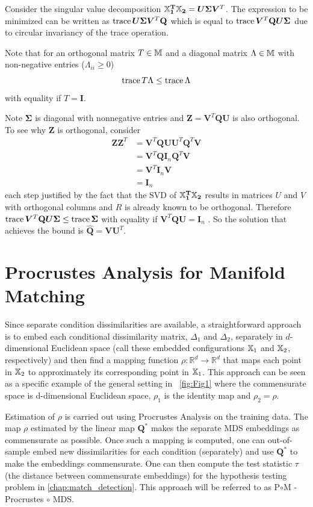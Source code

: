 \documentclass[12pt,oneside,final]{thesis}
\begin{document}
 Consider the singular value decomposition $\mathbf{{\mathbb{X}}_1^T {\mathbb{X}}_2}=\bm{U} \bm{\Sigma} \bm{V}^T$. The expression to be minimized can be written as $\operatorname{trace} {\bm{U} \bm{\Sigma} \bm{V}^T \mathbf{Q}}$ which is equal to  $\operatorname{trace} { \bm{V}^T \mathbf{Q} \bm{U} \bm{\Sigma}} $ due to circular invariancy of the trace operation.
 
 Note that for an orthogonal matrix $T\in \mathbb{M}$ and a diagonal matrix $\Lambda \in \mathbb{M}$ with non-negative entries ($\Lambda_{ii}\geq 0$)
 \[
 \operatorname{trace}{ T \Lambda } \leq \operatorname{trace}{ \Lambda} \] with equality if $T=\bm{I}$.
 
 Note $\bm{\Sigma}$ is diagonal with nonnegative entries  and $\bm{Z}=\bm{V}^T \mathbf{Q} \bm{U}$ is also orthogonal. To see why $\bm{Z}$ is orthogonal, consider 
 \begin{align*}
 \bm{Z}\bm{Z}^T &= \bm{V}^T \mathbf{Q} \bm{U} \bm{U}^T \mathbf{Q}^T  \bm{V} \\
 &= \bm{V}^T \mathbf{Q} \bm{I}_n \mathbf{Q}^T  \bm{V}\\
 &= \bm{V}^T \bm{I}_n  \bm{V} \\
 &= \bm{I}_n
 \end{align*} 
 each step justified by the fact that the SVD of $\mathbf{{\mathbb{X}}_1^T {\mathbb{X}}_2}$ results in matrices  $U$ and $V$ with orthogonal columns and $R$ is already known to be orthogonal.
 Therefore  $\operatorname{trace} { \bm{V}^T \mathbf{Q} \bm{U} \bm{\Sigma}}  \leq \operatorname{trace} \bm{\Sigma}$ 
with equality if  $\bm{V}^T \mathbf{Q} \bm{U} = \bm{I}_n$ . So the solution  that achieves the bound is $\hat{\mathbf{Q}}= \bm{V}  \bm{U}^T$.

\section{Procrustes Analysis for Manifold Matching}

Since separate  condition dissimilarities are available, a straightforward approach is to embed each conditional dissimilarity matrix, $\Delta_1$ and $\Delta_2$, separately  in  $d$-dimensional Euclidean space (call these embedded configurations ${\mathbb{X}}_1$ and ${\mathbb{X}}_2$, respectively) and then find a mapping function $\rho :\mathbb{R}^{d}\rightarrow\mathbb{R}^{d}$ that maps each point in ${\mathbb{X}}_2$ to approximately its corresponding point in ${\mathbb{X}}_1$. This approach can be seen as a specific example of the general setting in  ~\autoref{fig:Fig1} where the commensurate space is d-dimensional  Euclidean space, $\rho_1$  is the identity map and $\rho_2=\rho$. 

Estimation of $\rho$ is carried out using  Procrustes Analysis  on the training data. The map $\rho$ estimated by the linear map $\mathbf{Q}^*$   makes the separate MDS embeddings as commensurate as possible. Once such a mapping is computed, one can out-of-sample embed  new dissimilarities for each condition (separately)  and  use $\mathbf{Q}^*$ to make the embeddings commensurate.
One can then compute the test statistic $\tau$ (the distance between commensurate embeddings) for  the hypothesis testing problem in \autoref{chap:match_detection}. This approach will be referred to  as P$\circ$M - Procrustes $\circ$ MDS.
\end{document}
